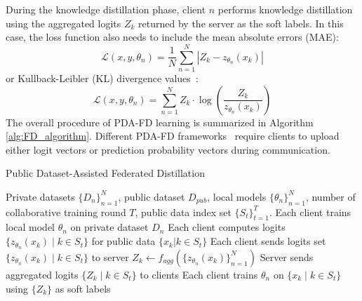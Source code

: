 During the knowledge distillation phase, client $n$ performs knowledge distillation~\cite{hinton2015distilling} using the aggregated logits $Z_k$ returned by the server as the soft labels. 
In this case, the loss function also needs to include the mean absolute errors (MAE):
\begin{equation}
\mathcal{L}(x, y, \theta_{n}) = \frac{1}{N} \sum_{n=1}^{N} \left| Z_k - z_{\theta_n}(x_k) \right|
\label{eq:loss_function_mae}
\end{equation}
or Kullback-Leibler (KL) divergence values~\cite{kullback1951information}:
\begin{equation}
\mathcal{L}(x, y, \theta_{n}) = \sum_{n=1}^{N} Z_k \cdot \log \left( \frac{Z_k}{z_{\theta_n}(x_k)} \right)
\label{eq:loss_function_kl}
\end{equation}
The overall procedure of PDA-FD learning is summarized in Algorithm \ref{alg:FD_algorithm}. Different PDA-FD frameworks~\cite{chang2019cronus, li2019fedmd, itahara2021distillation} require clients to upload either logit vectors or prediction probability vectors during communication.
\begin{algorithm}
\caption{Public Dataset-Assisted Federated Distillation}
\label{alg:FD_algorithm}
\begin{algorithmic}[1]
    \REQUIRE Private datasets $\{D_n\}_{n=1}^N$, public dataset $D_{pub}$, local models $\{\theta_n\}_{n=1}^N$, number of collaborative training round $T$, public data index set $\{S_t\}_{t=1}^T$.
       \STATE Each client trains local model $\theta_{n}$ on private dataset $D_{n}$
       \STATE Each client computes logits $\{z_{\theta_n}(x_k) \mid k \in S_t\}$ for public data $\{x_k|k \in S_t\}$
       \STATE Each client sends logits set $\{z_{\theta_n}(x_k) \mid k \in S_t\}$ to server
           \STATE $Z_k \leftarrow f_{agg}(\{z_{\theta_n}(x_k)\}_{n=1}^N)$
       \ENDFOR
       \STATE Server sends aggregated logits $\{Z_k \mid k \in S_t\}$ to clients
       \STATE Each client trains $\theta_{n}$ on $\{x_k \mid k \in S_t\}$ using $\{Z_k\}$ as soft labels
   \ENDFOR
\end{algorithmic}
\end{algorithm}

